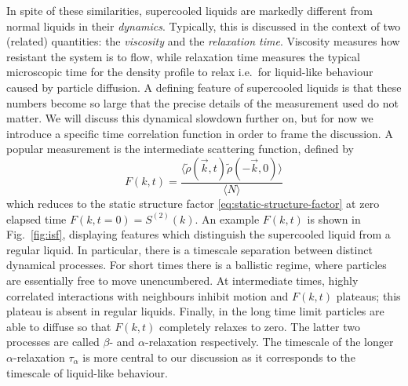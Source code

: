 \documentclass[11pt,twoside]{report}
\begin{document}
In spite of these similarities, supercooled liquids are markedly different from normal liquids in their \emph{dynamics}.
Typically, this is discussed in the context of two (related) quantities: the \emph{viscosity} and the \emph{relaxation time}.
Viscosity measures how resistant the system is to flow, while relaxation time measures the typical microscopic time for the density profile to relax i.e.\ for liquid-like behaviour caused by particle diffusion.
A defining feature of supercooled liquids is that these numbers become so large that the precise details of the measurement used do not matter.
We will discuss this dynamical slowdown further on, but for now we introduce a specific time correlation function in order to frame the discussion.
A popular measurement is the intermediate scattering function, defined by \cite{JanssenFP2018}
\begin{equation}\label{eq:isf}
  F(k, t)
  =
  \frac{
    \big\langle \widetilde{\rho}(\vec{k}, t) \widetilde{\rho}(-\vec{k}, 0) \big\rangle
  }{
    \langle N \rangle
  }
\end{equation}
which reduces to the static structure factor \eqref{eq:static-structure-factor} at zero elapsed time $F(k, t=0) = S^{(2)}(k)$.
An example $F(k,t)$ is shown in Fig.\ \ref{fig:isf}, displaying features which distinguish the supercooled liquid from a regular liquid.
In particular, there is a timescale separation between distinct dynamical processes.
For short times there is a ballistic regime, where particles are essentially free to move unencumbered.
At intermediate times, highly correlated interactions with neighbours inhibit motion and $F(k,t)$ plateaus; this plateau is absent in regular liquids.
Finally, in the long time limit particles are able to diffuse so that $F(k,t)$ completely relaxes to zero.
The latter two processes are called $\beta$- and $\alpha$-relaxation respectively.
The timescale of the longer $\alpha$-relaxation $\tau_\alpha$ is more central to our discussion as it corresponds to the timescale of liquid-like behaviour.
\end{document}
